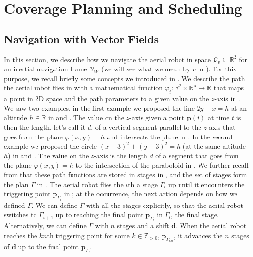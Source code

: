 
\chapter{Coverage Planning and Scheduling}
\label{cp:dyn}




\section{\color{red}Navigation with Vector Fields}\label{sec:gvf}

In this section, we describe how we navigate the aerial robot in space $\mathcal{Q}_v\subseteq\mathbb{R}^2$ for an inertial navigation frame $\mathcal{O}_W$ (we will see what we mean by $v$ in ). For this purpose, we recall briefly some concepts we introduced in . We describe the path the aerial robot flies in  with a mathematical function $\varphi_i:\mathbb{R}^2\times\mathbb{R}^\rho\rightarrow\mathbb{R}$ that maps a point in 2D space and the path parameters to a given value on the $z$-axis in . We saw two examples, in the first example we proposed the line $2y-x=h$ at an altitude $h\in\mathbb{R}$ in  and . The value on the $z$-axis given a point $\mathbf{p}(t)$ at time $t$ is then the length, let's call it $d$, of a vertical segment parallel to the $z$-axis that goes from the plane $\varphi(x,y)=h$ and intersects the plane in . In the second example we proposed the circle $(x-3)^2+(y-3)^2=h$ (at the same altitude $h$) in  and . The value on the $z$-axis is the length $d$ of a segment that goes from the plane $\varphi(x,y)=h$ to the intersection of the paraboloid in . We further recall from  that these path functions are stored in stages in , and the set of stages form the plan $\Gamma$ in . The aerial robot flies the $i$th a stage $\Gamma_i$ up until it encounters the triggering point $\mathbf{p}_{\Gamma_i}$ in ; at the occurrence, the next action depends on how we defined $\Gamma$. We can define $\Gamma$ with all the stages explicitly, so that the aerial robot switches to $\Gamma_{i+1}$ up to reaching the final point $\mathbf{p}_{\Gamma_l}$ in $\Gamma_l$, the final stage. Alternatively, we can define $\Gamma$ with $n$ stages and a shift $\mathbf{d}$. When the aerial robot reaches the $kn$th triggering point for some $k\in\mathbb{Z}_{>0}$, $\mathbf{p}_{\Gamma_{kn}}$, it advances the $n$ stages of $\mathbf{d}$ up to the final point $\mathbf{p}_{\Gamma_l}$.


